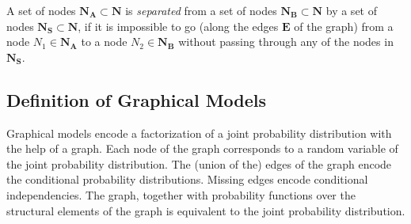 A set of nodes $\mathbf{N_{A}}\subset\mathbf{N}$ is \emph{separated}
from a set of nodes $\mathbf{N_{B}}\subset\mathbf{N}$ by a set of
nodes $\mathbf{N_{S}}\subset\mathbf{N}$, if it is impossible to go
(along the edges $\mathbf{E}$ of the graph) from a node $N_{1}\in\mathbf{N_{A}}$
to a node $N_{2}\in\mathbf{N_{B}}$ without passing through any of
the nodes in $\mathbf{N_{S}}$.

\subsection{Definition of Graphical Models}

Graphical models encode a factorization of a joint probability distribution
with the help of a graph. Each node of the graph corresponds to a
random variable of the joint probability distribution. The (union
of the) edges of the graph encode the conditional probability distributions.
Missing edges encode conditional independencies. The graph, together
with probability functions over the structural elements of the graph
is equivalent to the joint probability distribution.

